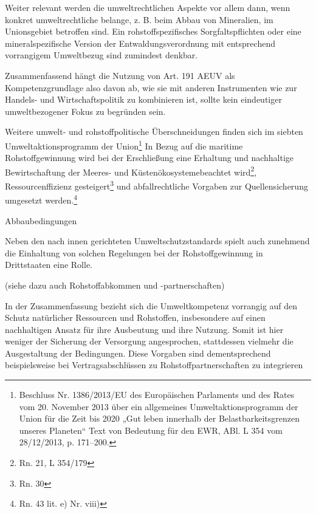\documentclass[12pt,a4paper,oneside]{book} %
\begin{document}
Weiter relevant werden die umweltrechtlichen Aspekte vor allem dann, wenn konkret umweltrechtliche belange, z. B. beim Abbau von Mineralien, im Unionsgebiet betroffen sind. Ein rohstoffspezifisches Sorgfaltspflichten oder eine mineralspezifische Version der Entwaldungsverordnung mit entsprechend vorrangigem Umweltbezug sind zumindest denkbar.
	
Zusammenfassend hängt die Nutzung von Art. 191 AEUV als Kompetenzgrundlage also davon ab, wie sie mit anderen Instrumenten wie zur Handels- und Wirtschaftspolitik zu kombinieren ist, sollte kein eindeutiger umweltbezogener Fokus zu begründen sein.

Weitere umwelt- und rohstoffpolitische Überschneidungen finden sich im siebten Umweltaktionsprogramm der Union\footnote{Beschluss Nr. 1386/2013/EU des Europäischen Parlaments und des Rates vom 20. November 2013 über ein allgemeines Umweltaktionsprogramm der Union für die Zeit bis 2020 „Gut leben innerhalb der Belastbarkeitsgrenzen unseres Planeten“ Text von Bedeutung für den EWR, ABl. L 354 vom 28/12/2013, p. 171–200.} In Bezug auf die maritime Rohstoffgewinnung wird bei der Erschließung eine \glqq Erhaltung und nachhaltige Bewirtschaftung der Meeres- und Küstenökosysteme\glqq beachtet wird\footnote{Rn. 21, L 354/179}, Ressourcenffizienz gesteigert\footnote{Rn. 30} und abfallrechtliche Vorgaben zur Quellensicherung umgesetzt werden.\footnote{Rn. 43 lit. e) Nr. viii)}

Abbaubedingungen

Neben den nach innen gerichteten Umweltschutzstandards spielt auch zunehmend die Einhaltung von solchen Regelungen bei der Rohstoffgewinnung in Drittstaaten eine Rolle.\autocite{Schorkopf, Rohstoffverwaltung, Rn. 30}

(siehe dazu auch Rohstoffabkommen und -partnerschaften)
	


In der Zusammenfassung bezieht sich die Umweltkompetenz vorrangig auf den Schutz natürlicher Ressourcen und Rohstoffen, insbesondere auf einen nachhaltigen Ansatz für ihre Ausbeutung und ihre Nutzung. Somit ist hier weniger der Sicherung der Versorgung angesprochen, stattdessen vielmehr die Ausgestaltung der Bedingungen. Diese Vorgaben sind dementsprechend beispielsweise bei Vertragsabschlüssen zu Rohstoffpartnerschaften zu integrieren
	
\end{document}
